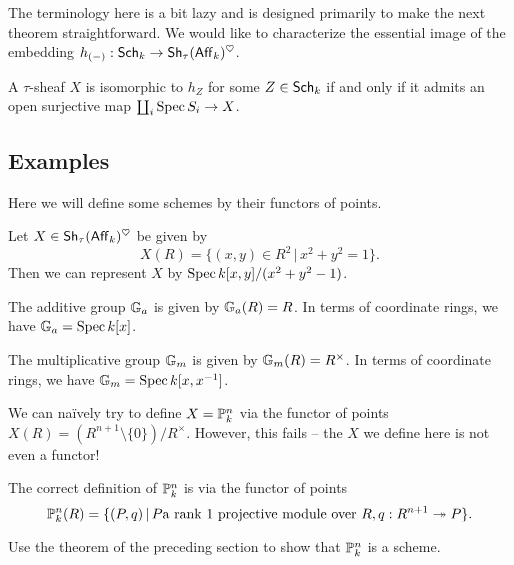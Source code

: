 \documentclass{amsart}
\begin{document}
The terminology here is a bit lazy and is designed primarily to make the next theorem straightforward.
We would like to characterize the essential image of the embedding $h_{(-)}: \mathsf{Sch}_k \to \mathsf{Sh}_\tau(\mathsf{Aff}_k)^\heartsuit$.

\begin{thm}
A $\tau$-sheaf $X$ is isomorphic to $h_Z$ for some $Z \in \mathsf{Sch}_k$ if and only if it admits an open surjective map $\coprod_i \operatorname{Spec} S_i \to X$.
\end{thm}

\subsection{Examples}

Here we will define some schemes by their functors of points.

\begin{ex}
	Let $X \in \mathsf{Sh}_\tau(\mathsf{Aff}_k)^\heartsuit$ be given by
	\[
		X(R) = \{ (x, y) \in R^2 \, | \, x^2 + y^2 = 1 \}.
	\]
	Then we can represent $X$ by $\operatorname{Spec} k[x, y] / (x^2 + y^2 - 1)$.
\end{ex}

\begin{ex}
	The additive group $\mathbb{G}_a$ is given by $\mathbb{G}_a(R) = R$.
	In terms of coordinate rings, we have $\mathbb{G}_a = \operatorname{Spec} k[x]$.
\end{ex}

\begin{ex}
	The multiplicative group $\mathbb{G}_m$ is given by $\mathbb{G}_m(R) = R^\times$.
	In terms of coordinate rings, we have $\mathbb{G}_m = \operatorname{Spec} k[x, x^{-1}]$.
\end{ex}

\begin{ex}
	We can na\"ively try to define $X = \mathbb{P}^n_k$ via the functor of points $X(R) = (R^{n+1} \setminus \{ 0 \}) / R^\times$.
	However, this fails -- the $X$ we define here is not even a functor!
\end{ex}

\begin{ex}
	The correct definition of $\mathbb{P}^n_k$ is via the functor of points
	\[
		\mathbb{P}^n_k(R) = \{ (P, q) \, | \, P \textrm{a rank $1$ projective module over $R$}, q: R^{n+1} \twoheadrightarrow P \}.
	\]
\end{ex}

\begin{exer}
	Use the theorem of the preceding section to show that $\mathbb{P}^n_k$ is a scheme.
\end{exer}
\end{document}
